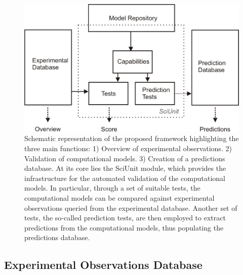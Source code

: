 \documentclass[CompPsych]{stjour}
\begin{document}
\begin{figure}
\includegraphics[width=\textwidth]{Figures/SciUnit-Paper-Schematic-2}
\caption{Schematic representation of the proposed framework highlighting the three main functions: 1) Overview of experimental observations. 2) Validation of computational models. 3) Creation of a predictions database. At its core
lies the SciUnit module, which provides the infrastructure for the automated validation of the computational models. In particular, through a set of suitable tests, the computational models can be compared against experimental observations
queried from the experimental database. Another set of tests, the so-called prediction tests, are then employed to extract predictions from the computational models, thus populating the predictions database. }
\label{Fig:Scheme}
\end{figure}



\subsection{Experimental Observations Database}
\end{document}
